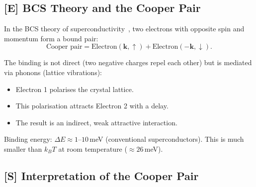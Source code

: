 \subsection{[E] BCS Theory and the Cooper Pair}

In the BCS theory of superconductivity~\cite{BCS1957,Cooper1956},
two electrons with opposite spin and momentum
form a bound pair:
\begin{equation}
  \text{Cooper pair} = \text{Electron}(\mathbf{k},\uparrow) +
  \text{Electron}(-\mathbf{k},\downarrow).
\end{equation}

The binding is not direct (two negative charges repel each other)
but is mediated via phonons (lattice vibrations):
\begin{itemize}
  \item Electron 1 polarises the crystal lattice.
  \item This polarisation attracts Electron 2 with a delay.
  \item The result is an indirect, weak attractive interaction.
\end{itemize}

Binding energy: $\Delta E \approx 1$--$10$\,meV
(conventional superconductors). This is much smaller than
$k_B T$ at room temperature ($\approx 26$\,meV).

\begin{center}
\end{center}

\subsection{[S] Interpretation of the Cooper Pair}

